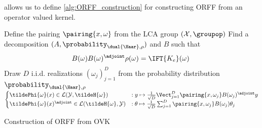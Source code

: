  allows us to define \cref{alg:ORFF_construction} for
constructing \acs{ORFF} from an operator valued kernel.
\begin{center}
    \begin{algorithm2e}[H]\label{alg:ORFF_construction}
        \SetAlgoLined
        \BlankLine
        Define the pairing $\pairing{x, \omega}$ from the \acs{LCA} group
        $(\mathcal{X}, \groupop)$\; Find a decomposition
        $(A,\probability_{\dual{\Haar},\rho})$ and $B$ such that
        \begin{dmath*}
            B(\omega)B(\omega)^\adjoint \rho(\omega)=\IFT{K_e}(\omega)\text{\;}
        \end{dmath*}
        \nl Draw $D$ i.i.d. realizations $(\omega_j)_{j=1}^D$ from the
        probability distribution $\probability_{\dual{\Haar},\rho}$\;
        \nl \Return
        $\begin{cases}
            \tildePhi{\omega}(x) \in \mathcal{L}(\mathcal{Y}, \tildeH{\omega})
            &: y \mapsto \frac{1}{\sqrt{D}}\Vect_{j=1}^D\pairing{x,
            \omega_j}B(\omega_j)^\adjoint y \\
            \tildePhi{\omega}(x)^\adjoint \in\mathcal{L}(\tildeH{\omega},
            \mathcal{Y}) &: \theta \mapsto \frac{1}{\sqrt{D}} \sum_{j=1}^D
            \pairing{x, \omega_j}B(\omega_j)\theta_j
        \end{cases}$\;
        \caption{Construction of \acs{ORFF} from \acs{OVK}}
    \end{algorithm2e}
\end{center}
